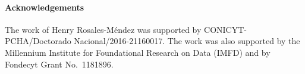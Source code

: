 \documentclass{llncs}
\begin{document}


{\footnotesize
\paragraph{Acknowledgements} The work of Henry Rosales-M\'endez was supported by CONICYT-PCHA/Doctorado Nacional/2016-21160017. The work was also supported by the Millennium Institute for Foundational Research on Data (IMFD) and by Fondecyt Grant No.\ 1181896.}

%


\end{document}
